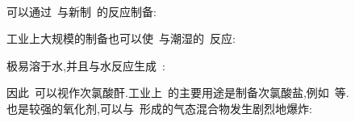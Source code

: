 \documentclass{ctexbook}
\begin{document}
\paragraph{}
可以通过~与新制~的反应制备:
\begin{tightcenter}
\end{tightcenter}
工业上大规模的制备也可以使~与潮湿的~反应:
\begin{tightcenter}
\end{tightcenter}
\indent {}极易溶于水,并且与水反应生成~:
\begin{tightcenter}
\end{tightcenter}
因此~可以视作次氯酸酐.工业上~的主要用途是制备次氯酸盐,例如~等.\\
\indent {}也是较强的氧化剂,可以与~形成的气态混合物发生剧烈地爆炸:
\begin{tightcenter}
\end{tightcenter}
\end{document}
